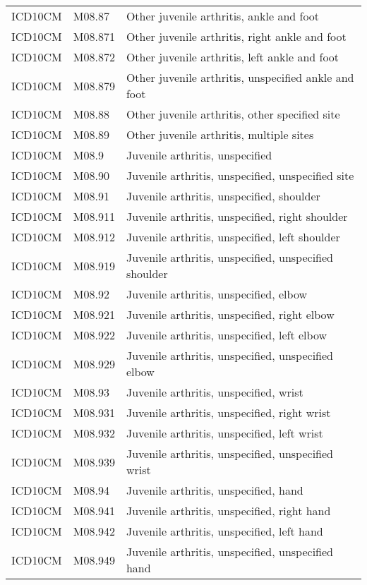 \begin{longtable}{p{}p{}p{}}
  ICD10CM & M08.87 & Other juvenile arthritis, ankle and foot \\ 
  ICD10CM & M08.871 & Other juvenile arthritis, right ankle and foot \\ 
  ICD10CM & M08.872 & Other juvenile arthritis, left ankle and foot \\ 
  ICD10CM & M08.879 & Other juvenile arthritis, unspecified ankle and foot \\ 
  ICD10CM & M08.88 & Other juvenile arthritis, other specified site \\ 
  ICD10CM & M08.89 & Other juvenile arthritis, multiple sites \\ 
  ICD10CM & M08.9 & Juvenile arthritis, unspecified \\ 
  ICD10CM & M08.90 & Juvenile arthritis, unspecified, unspecified site \\ 
  ICD10CM & M08.91 & Juvenile arthritis, unspecified, shoulder \\ 
  ICD10CM & M08.911 & Juvenile arthritis, unspecified, right shoulder \\ 
  ICD10CM & M08.912 & Juvenile arthritis, unspecified, left shoulder \\ 
  ICD10CM & M08.919 & Juvenile arthritis, unspecified, unspecified shoulder \\ 
  ICD10CM & M08.92 & Juvenile arthritis, unspecified, elbow \\ 
  ICD10CM & M08.921 & Juvenile arthritis, unspecified, right elbow \\ 
  ICD10CM & M08.922 & Juvenile arthritis, unspecified, left elbow \\ 
  ICD10CM & M08.929 & Juvenile arthritis, unspecified, unspecified elbow \\ 
  ICD10CM & M08.93 & Juvenile arthritis, unspecified, wrist \\ 
  ICD10CM & M08.931 & Juvenile arthritis, unspecified, right wrist \\ 
  ICD10CM & M08.932 & Juvenile arthritis, unspecified, left wrist \\ 
  ICD10CM & M08.939 & Juvenile arthritis, unspecified, unspecified wrist \\ 
  ICD10CM & M08.94 & Juvenile arthritis, unspecified, hand \\ 
  ICD10CM & M08.941 & Juvenile arthritis, unspecified, right hand \\ 
  ICD10CM & M08.942 & Juvenile arthritis, unspecified, left hand \\ 
  ICD10CM & M08.949 & Juvenile arthritis, unspecified, unspecified hand \\ 

\end{longtable}
